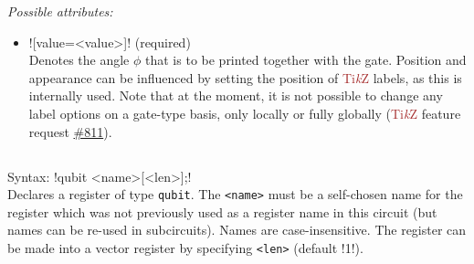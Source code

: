 \documentclass{scrartcl}
\def\TikZ{\textcolor{brown}{Ti\textit kZ}}
\begin{document}
         \emph{Possible attributes:}
         \begin{itemize}
            \item \yquant![value=<value>]! (required) \\
               Denotes the angle $\phi$ that is to be printed together with the gate.
               Position and appearance can be influenced by setting the position of \TikZ{} labels, as this is internally used.
               Note that at the moment, it is not possible to change any label options on a gate\hyp type basis, only locally or fully globally (\TikZ{} feature request \href{https://github.com/pgf-tikz/pgf/issues/811}{\#811}).
         \end{itemize}

      \subsection{\texorpdfstring{}{qubit}}
         Syntax: \yquant!qubit <name>[<len>];! \\
         Declares a register of type \texttt{qubit}.
         The \texttt{<name>} must be a self\hyp chosen name for the register which was not previously used as a register name in this circuit (but names can be re\hyp used in subcircuits).
         Names are case\hyp insensitive.
         The register can be made into a vector register by specifying \texttt{<len>} (default \tex!1!).
\end{document}

